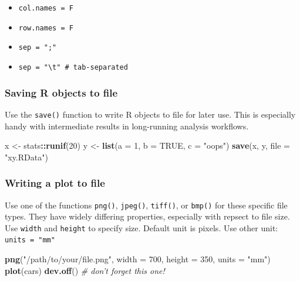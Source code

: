 \documentclass[]{book}
\newenvironment{Shaded}{\begin{snugshade}}{\end{snugshade}}
\newcommand{\CommentTok}[1]{\textcolor[rgb]{0.56,0.35,0.01}{\textit{#1}}}
\newcommand{\DataTypeTok}[1]{\textcolor[rgb]{0.13,0.29,0.53}{#1}}
\newcommand{\DecValTok}[1]{\textcolor[rgb]{0.00,0.00,0.81}{#1}}
\newcommand{\KeywordTok}[1]{\textcolor[rgb]{0.13,0.29,0.53}{\textbf{#1}}}
\newcommand{\NormalTok}[1]{#1}
\newcommand{\OperatorTok}[1]{\textcolor[rgb]{0.81,0.36,0.00}{\textbf{#1}}}
\newcommand{\OtherTok}[1]{\textcolor[rgb]{0.56,0.35,0.01}{#1}}
\newcommand{\StringTok}[1]{\textcolor[rgb]{0.31,0.60,0.02}{#1}}
\providecommand{\tightlist}{%
  \setlength{\itemsep}{0pt}\setlength{\parskip}{0pt}}
\begin{document}
\begin{itemize}
\tightlist
\item
  \texttt{col.names\ =\ F}
\item
  \texttt{row.names\ =\ F}
\item
  \texttt{sep\ =\ ";"}
\item
  \texttt{sep\ =\ "\textbackslash{}t"\ \#\ tab-separated}
\end{itemize}

\hypertarget{saving-r-objects-to-file}{%
\subsubsection*{Saving R objects to file}\label{saving-r-objects-to-file}}

Use the \texttt{save()} function to write R objects to file for later use.
This is especially handy with intermediate results in long-running analysis workflows.

\begin{Shaded}
\begin{Highlighting}[]
\NormalTok{x <-}\StringTok{ }\NormalTok{stats}\OperatorTok{::}\KeywordTok{runif}\NormalTok{(}\DecValTok{20}\NormalTok{)}
\NormalTok{y <-}\StringTok{ }\KeywordTok{list}\NormalTok{(}\DataTypeTok{a =} \DecValTok{1}\NormalTok{, }\DataTypeTok{b =} \OtherTok{TRUE}\NormalTok{, }\DataTypeTok{c =} \StringTok{"oops"}\NormalTok{)}
\KeywordTok{save}\NormalTok{(x, y, }\DataTypeTok{file =} \StringTok{"xy.RData"}\NormalTok{)}
\end{Highlighting}
\end{Shaded}

\hypertarget{writing-a-plot-to-file}{%
\subsubsection*{Writing a plot to file}\label{writing-a-plot-to-file}}

Use one of the functions \texttt{png()}, \texttt{jpeg()}, \texttt{tiff()}, or \texttt{bmp()} for these specific file types. They have widely differing properties, especially with repsect to file size.\\
Use \texttt{width} and \texttt{height} to specify size. Default unit is pixels. Use other unit: \texttt{units\ =\ "mm"}

\begin{Shaded}
\begin{Highlighting}[]
\KeywordTok{png}\NormalTok{(}\StringTok{"/path/to/your/file.png"}\NormalTok{,}
    \DataTypeTok{width =} \DecValTok{700}\NormalTok{, }\DataTypeTok{height =} \DecValTok{350}\NormalTok{, }\DataTypeTok{units =} \StringTok{"mm"}\NormalTok{)}
\KeywordTok{plot}\NormalTok{(cars)}
\KeywordTok{dev.off}\NormalTok{() }\CommentTok{# don't forget this one!}
\end{Highlighting}
\end{Shaded}
\end{document}

